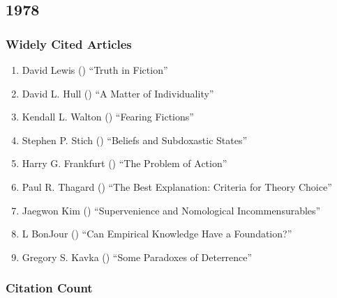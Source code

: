 \documentclass[
  10pt,
  letterpaper,
  DIV=11,
  numbers=noendperiod,
  twoside]{scrartcl}
\providecommand{\tightlist}{%
  \setlength{\itemsep}{0pt}\setlength{\parskip}{0pt}}\usepackage{longtable,booktabs,array}
\begin{document}
\newpage

\subsection{1978}\label{sec-s1978}

\subsubsection*{Widely Cited Articles}\label{widely-cited-articles-21}

\begin{enumerate}
\def\labelenumi{\arabic{enumi}.}
\tightlist
\item
  David Lewis () ``Truth in
  Fiction''
\item
  David L. Hull () ``A Matter of
  Individuality''
\item
  Kendall L. Walton () ``Fearing
  Fictions''
\item
  Stephen P. Stich () ``Beliefs
  and Subdoxastic States''
\item
  Harry G. Frankfurt () ``The
  Problem of Action''
\item
  Paul R. Thagard () ``The Best
  Explanation: Criteria for Theory Choice''
\item
  Jaegwon Kim () ``Supervenience
  and Nomological Incommensurables''
\item
  L BonJour () ``Can Empirical
  Knowledge Have a Foundation?''
\item
  Gregory S. Kavka () ``Some
  Paradoxes of Deterrence''
\end{enumerate}

\subsubsection*{Citation Count}\label{sec-count-1978}
\end{document}
